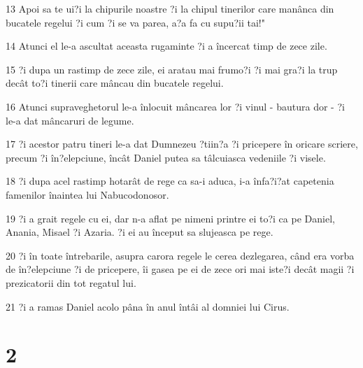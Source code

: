 \par 13 Apoi sa te ui?i la chipurile noastre ?i la chipul tinerilor care manânca din bucatele regelui ?i cum ?i se va parea, a?a fa cu supu?ii tai!"
\par 14 Atunci el le-a ascultat aceasta rugaminte ?i a încercat timp de zece zile.
\par 15 ?i dupa un rastimp de zece zile, ei aratau mai frumo?i ?i mai gra?i la trup decât to?i tinerii care mâncau din bucatele regelui.
\par 16 Atunci supraveghetorul le-a înlocuit mâncarea lor ?i vinul - bautura dor - ?i le-a dat mâncaruri de legume.
\par 17 ?i acestor patru tineri le-a dat Dumnezeu ?tiin?a ?i pricepere în oricare scriere, precum ?i în?elepciune, încât Daniel putea sa tâlcuiasca vedeniile ?i visele.
\par 18 ?i dupa acel rastimp hotarât de rege ca sa-i aduca, i-a înfa?i?at capetenia famenilor înaintea lui Nabucodonosor.
\par 19 ?i a grait regele cu ei, dar n-a aflat pe nimeni printre ei to?i ca pe Daniel, Anania, Misael ?i Azaria. ?i ei au început sa slujeasca pe rege.
\par 20 ?i în toate întrebarile, asupra carora regele le cerea dezlegarea, când era vorba de în?elepciune ?i de pricepere, îi gasea pe ei de zece ori mai iste?i decât magii ?i prezicatorii din tot regatul lui.
\par 21 ?i a ramas Daniel acolo pâna în anul întâi al domniei lui Cirus.

\chapter{2}

